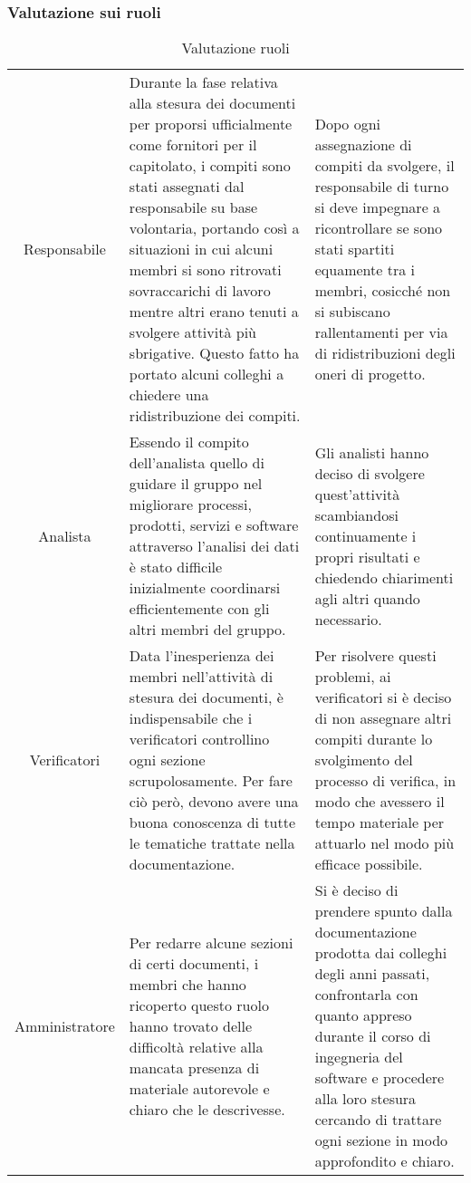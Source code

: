 \subsubsection{Valutazione sui ruoli}	
\setlength{\tabcolsep}{10pt}
\begin{longtable}[h!] { c  m{7 cm} m{6cm}}
	\caption{Valutazione ruoli} \\
	\rowcolor{lightgray}
	\thead{Test}  & \thead{Descrizione} & \thead{Esito} \\ \endhead%
			Responsabile & Durante la fase relativa alla stesura dei documenti per proporsi ufficialmente come fornitori per il capitolato, i compiti sono stati assegnati dal responsabile su base volontaria, portando così a situazioni in cui alcuni membri si sono ritrovati sovraccarichi di lavoro
			mentre altri erano tenuti a svolgere attività più sbrigative. Questo fatto ha portato alcuni colleghi a chiedere una ridistribuzione dei compiti.& Dopo ogni assegnazione di compiti da svolgere, il responsabile di turno si deve impegnare a ricontrollare se sono stati spartiti equamente tra i membri, cosicché non si subiscano rallentamenti per via di ridistribuzioni degli oneri di progetto. \\			
			Analista & 	Essendo il compito dell'analista quello di guidare il gruppo nel migliorare processi, prodotti, servizi e software attraverso l'analisi dei dati è stato difficile inizialmente coordinarsi efficientemente con gli altri membri del gruppo. & Gli analisti hanno deciso di svolgere quest'attività scambiandosi continuamente i propri risultati e chiedendo chiarimenti agli altri quando necessario.\\
			Verificatori &	Data l’inesperienza dei membri nell'attività di stesura dei documenti, è indispensabile che i verificatori controllino ogni sezione scrupolosamente.	Per fare ciò però,  devono avere una buona conoscenza di tutte le tematiche trattate nella documentazione. & Per risolvere questi problemi, ai verificatori
			si è deciso di non assegnare altri compiti durante lo svolgimento del processo di verifica, in
			modo che avessero il tempo materiale per attuarlo nel modo più efficace possibile.\\
			Amministratore & Per redarre alcune sezioni di certi documenti, i membri che hanno ricoperto questo ruolo hanno trovato delle difficoltà relative alla mancata presenza di materiale autorevole e chiaro che le descrivesse. & Si è deciso di prendere spunto dalla documentazione prodotta dai colleghi degli anni passati, confrontarla con quanto appreso durante il corso di ingegneria del software e procedere alla loro stesura cercando di trattare ogni sezione in modo approfondito e chiaro. \\
	\end{longtable}


